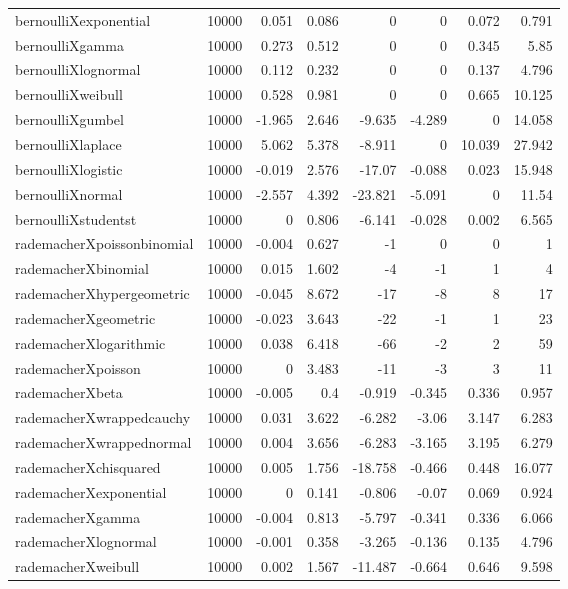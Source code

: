 \begin{table}[!htbp]
{\begin{tabular}{lrrrrrrr}
bernoulliXexponential & 10000 & 0.051 & 0.086 & 0 & 0 & 0.072 & 0.791 \\ 
bernoulliXgamma & 10000 & 0.273 & 0.512 & 0 & 0 & 0.345 & 5.85 \\ 
bernoulliXlognormal & 10000 & 0.112 & 0.232 & 0 & 0 & 0.137 & 4.796 \\ 
bernoulliXweibull & 10000 & 0.528 & 0.981 & 0 & 0 & 0.665 & 10.125 \\ 
bernoulliXgumbel & 10000 & -1.965 & 2.646 & -9.635 & -4.289 & 0 & 14.058 \\ 
bernoulliXlaplace & 10000 & 5.062 & 5.378 & -8.911 & 0 & 10.039 & 27.942 \\ 
bernoulliXlogistic & 10000 & -0.019 & 2.576 & -17.07 & -0.088 & 0.023 & 15.948 \\ 
bernoulliXnormal & 10000 & -2.557 & 4.392 & -23.821 & -5.091 & 0 & 11.54 \\ 
bernoulliXstudentst & 10000 & 0 & 0.806 & -6.141 & -0.028 & 0.002 & 6.565 \\ 
rademacherXpoissonbinomial & 10000 & -0.004 & 0.627 & -1 & 0 & 0 & 1 \\ 
rademacherXbinomial & 10000 & 0.015 & 1.602 & -4 & -1 & 1 & 4 \\ 
rademacherXhypergeometric & 10000 & -0.045 & 8.672 & -17 & -8 & 8 & 17 \\ 
rademacherXgeometric & 10000 & -0.023 & 3.643 & -22 & -1 & 1 & 23 \\ 
rademacherXlogarithmic & 10000 & 0.038 & 6.418 & -66 & -2 & 2 & 59 \\ 
rademacherXpoisson & 10000 & 0 & 3.483 & -11 & -3 & 3 & 11 \\ 
rademacherXbeta & 10000 & -0.005 & 0.4 & -0.919 & -0.345 & 0.336 & 0.957 \\ 
rademacherXwrappedcauchy & 10000 & 0.031 & 3.622 & -6.282 & -3.06 & 3.147 & 6.283 \\ 
rademacherXwrappednormal & 10000 & 0.004 & 3.656 & -6.283 & -3.165 & 3.195 & 6.279 \\ 
rademacherXchisquared & 10000 & 0.005 & 1.756 & -18.758 & -0.466 & 0.448 & 16.077 \\ 
rademacherXexponential & 10000 & 0 & 0.141 & -0.806 & -0.07 & 0.069 & 0.924 \\ 
rademacherXgamma & 10000 & -0.004 & 0.813 & -5.797 & -0.341 & 0.336 & 6.066 \\ 
rademacherXlognormal & 10000 & -0.001 & 0.358 & -3.265 & -0.136 & 0.135 & 4.796 \\ 
rademacherXweibull & 10000 & 0.002 & 1.567 & -11.487 & -0.664 & 0.646 & 9.598 \\ 

\end{tabular}}
\end{table}
